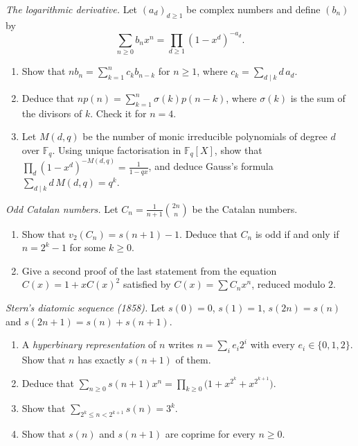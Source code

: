 \begin{exercise}[$\star\star$]\label{pb:eulerlog}
\emph{The logarithmic derivative.} Let $(a_d)_{d\ge1}$ be complex numbers and define $(b_n)$ by
\[
\sum_{n\ge0}b_nx^n=\prod_{d\ge1}(1-x^d)^{-a_d}.
\]
\begin{enumerate}[label=(\alph*)]
\item Show that $nb_n=\sum_{k=1}^nc_kb_{n-k}$ for $n\ge1$, where $c_k=\sum_{d\mid k}d\,a_d$.
\item Deduce that $np(n)=\sum_{k=1}^n\sigma(k)p(n-k)$, where $\sigma(k)$ is the sum of the divisors of $k$. Check it for $n=4$.
\item Let $M(d,q)$ be the number of monic irreducible polynomials of degree $d$ over $\mathbb F_q$. Using unique factorisation in
$\mathbb F_q[X]$, show that $\prod_d(1-x^d)^{-M(d,q)}=\frac1{1-qx}$, and deduce Gauss's formula $\sum_{d\mid k}d\,M(d,q)=q^k$.
\end{enumerate}
\end{exercise}

\begin{exercise}[$\star\star$]\label{pb:catalanodd}
\emph{Odd Catalan numbers.} Let $C_n=\frac1{n+1}\binom{2n}n$ be the Catalan numbers.
\begin{enumerate}[label=(\alph*)]
\item Show that $v_2(C_n)=s(n+1)-1$. Deduce that $C_n$ is odd if and only if $n=2^k-1$ for some $k\ge0$.
\item Give a second proof of the last statement from the equation $C(x)=1+xC(x)^2$ satisfied by $C(x)=\sum C_nx^n$, reduced
modulo $2$.
\end{enumerate}
\end{exercise}

\begin{exercise}[$\star\star$]\label{pb:stern}
\emph{Stern's diatomic sequence (1858).} Let $s(0)=0$, $s(1)=1$, $s(2n)=s(n)$ and $s(2n+1)=s(n)+s(n+1)$.
\begin{enumerate}[label=(\alph*)]
\item A \emph{hyperbinary representation} of $n$ writes $n=\sum_ie_i2^i$ with every $e_i\in\{0,1,2\}$. Show that $n$ has exactly
$s(n+1)$ of them.
\item Deduce that $\sum_{n\ge0}s(n+1)x^n=\prod_{k\ge0}\bigl(1+x^{2^k}+x^{2^{k+1}}\bigr)$.
\item Show that $\sum_{2^k\le n<2^{k+1}}s(n)=3^k$.
\item Show that $s(n)$ and $s(n+1)$ are coprime for every $n\ge0$.
\end{enumerate}
\end{exercise}

